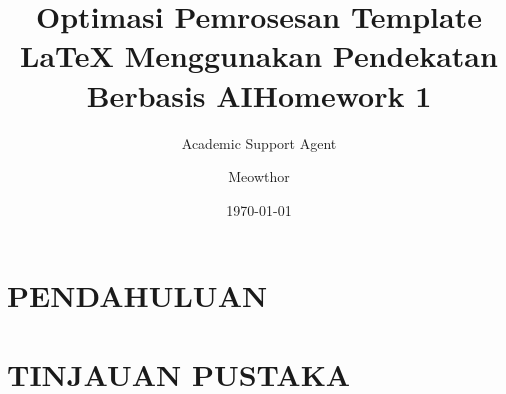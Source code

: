 \documentclass{assignmeownt}
\title{Optimasi Pemrosesan Template LaTeX Menggunakan Pendekatan Berbasis AI}
\author{Academic Support Agent}
\date{\today}
\begin{document}
\maketitle

\begin{abstract}

\end{abstract}

\chapter{PENDAHULUAN}


\chapter{TINJAUAN PUSTAKA}



\title{Homework 1}
\author{Meowthor}
\date{}
\end{document}
